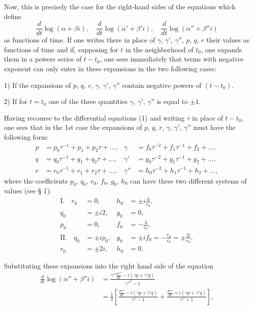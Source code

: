 \documentclass{article}
\begin{document}
Now, this is precisely the case for the right-hand sides of the equations which define
\[
\frac{d}{dt}\log(\alpha + \beta i), \quad \frac{d}{dt}\log(\alpha' + \beta'i), \quad \frac{d}{dt}\log(\alpha'' + \beta''i)
\]
as functions of time. If one writes there in place of $\gamma$, $\gamma'$, $\gamma''$, $p$, $q$, $r$ their values as functions of time and if, 
supposing for $t$ in the neighborhood of $t_0$, one expands them in a powers series of $t - t_0$, one sees immediately that terms with negative exponent can only enter in these expansions in the two following cases:

1) If the expansions of $p$, $q$, $r$, $\gamma$, $\gamma'$, $\gamma''$ contain negative powers of $(t - t_0)$.

2) If for $t = t_0$ one of the three quantities $\gamma$, $\gamma'$, $\gamma''$ is equal to $\pm 1$.

Having recourse to the differential equations (1) and writing $\tau$ in place of $t - t_0$, one sees that in the 1st case the expansions of $p$, $q$, $r$, $\gamma$, $\gamma'$, $\gamma''$ must have the following form:
\begin{align*}
p &= p_0\tau^{-1} + p_1 + p_2\tau + \ldots, & \gamma &= f_0\tau^{-2} + f_1\tau^{-1} + f_2 + \ldots, \\
q &= q_0\tau^{-1} + q_1 + q_2\tau + \ldots, & \gamma' &= g_0\tau^{-2} + g_1\tau^{-1} + g_2 + \ldots, \\
r &= r_0\tau^{-1} + r_1 + r_2\tau + \ldots, & \gamma'' &= h_0\tau^{-2} + h_1\tau^{-1} + h_2 + \ldots,
\end{align*}
where the coefficients $p_0$, $q_0$, $r_0$, $f_0$, $g_0$, $h_0$ can have these two different systems of values (see § 1):
\begin{align*}
\text{I.} \quad r_0 &= 0, & h_0 &= \pm i\frac{4}{c_0}, \\
q_0 &= \pm i2, & g_0 &= 0, \\
p_0 &= 0, & f_0 &= -\frac{4}{c_0}, \\
\text{II.} \quad q_0 &= \pm ip_0, & g_0 &= \pm if_0 = -\frac{r_0}{c_0} = \pm \frac{2i}{c_0}, \\
r_0 &= \pm 2i, & h_0 &= 0.
\end{align*}

Substituting these expansions into the right hand side of the equation
\begin{align*}
\frac{d}{dt}\log(\alpha'' + \beta''i) &= \frac{\gamma''\frac{d\gamma''}{dt} - i(\gamma p + \gamma'q)}{\gamma''^2 - 1} \\
&= \frac{1}{2}\left[\frac{\frac{d\gamma''}{dt} - i(\gamma p + \gamma'q)}{\gamma'' - 1} + \frac{\frac{d\gamma''}{dt} + i(\gamma p + \gamma'q)}{\gamma'' + 1}\right],
\end{align*}
\end{document}
